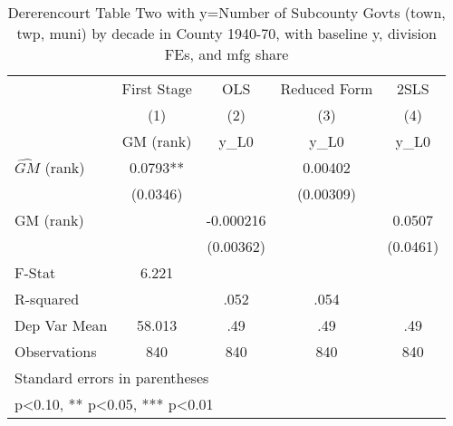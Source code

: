 \begin{table}[htbp]\centering
\def\sym#1{\ifmmode^{#1}\else\(^{#1}\)\fi}
\caption{Dererencourt Table Two with y=Number of Subcounty Govts (town, twp, muni) by decade in County 1940-70, with baseline y, division FEs, and mfg share}
\begin{tabular}{l*{4}{c}}
\toprule
                    & First Stage   &         OLS   &Reduced Form   &        2SLS   \\
                    &\multicolumn{1}{c}{(1)}&\multicolumn{1}{c}{(2)}&\multicolumn{1}{c}{(3)}&\multicolumn{1}{c}{(4)}\\
                    &\multicolumn{1}{c}{GM  (rank)}&\multicolumn{1}{c}{y\_L0}&\multicolumn{1}{c}{y\_L0}&\multicolumn{1}{c}{y\_L0}\\
\midrule
$\hat{GM}$ (rank)   &      0.0793** &               &     0.00402   &               \\
                    &    (0.0346)   &               &   (0.00309)   &               \\
\addlinespace
GM  (rank)          &               &   -0.000216   &               &      0.0507   \\
                    &               &   (0.00362)   &               &    (0.0461)   \\
\midrule
F-Stat              &       6.221   &               &               &               \\
R-squared           &               &        .052   &        .054   &               \\
Dep Var Mean        &      58.013   &         .49   &         .49   &         .49   \\
Observations        &         840   &         840   &         840   &         840   \\
\bottomrule
\multicolumn{5}{l}{\footnotesize Standard errors in parentheses}\\
\multicolumn{5}{l}{\footnotesize * p<0.10, ** p<0.05, *** p<0.01}\\
\end{tabular}
\end{table}
